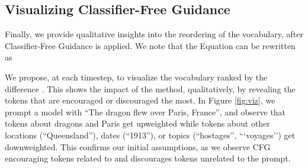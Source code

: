 \documentclass{article}
\begin{document}
\subsection{Visualizing Classifier-Free Guidance}
\label{sct:explanation:visualizing}

Finally, we provide qualitative insights into the reordering of the vocabulary, after Classifier-Free Guidance is applied. We note that the Equation can be rewritten as 



We propose, at each timestep, to visualize the vocabulary ranked by the difference . This shows the impact of the method, qualitatively, by revealing the tokens that are encouraged or discouraged the most. In Figure \ref{fig:viz}, we prompt a model with ``The dragon flew over Paris, France'', and observe that tokens about dragons and Paris get upweighted while tokens about other locations (``Queensland''), dates (``1913''), or topics (``hostages'', ```voyages'') get downweighted. This confirms our initial assumptions, as we observe CFG encouraging tokens related to and discourages tokens unrelated to the prompt.
\end{document}
